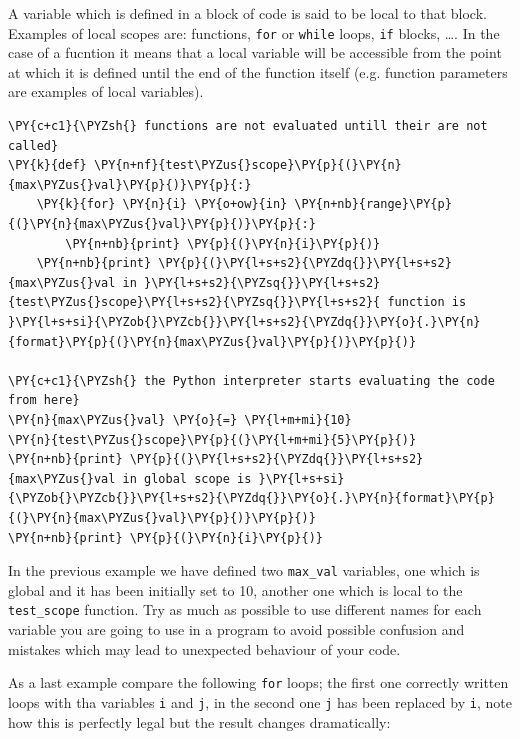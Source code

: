 A variable which is defined in a block of code is said to be local to that block. Examples of local scopes are: functions, \texttt{for} or \texttt{while} loops, \texttt{if} blocks, \ldots. In the case of a fucntion it means that a local variable will be accessible from the point at which it is defined until the end of the function itself (e.g. function parameters are examples of local variables).

\begin{Verbatim}[commandchars=\\\{\}]
\PY{c+c1}{\PYZsh{} functions are not evaluated untill their are not called}
\PY{k}{def} \PY{n+nf}{test\PYZus{}scope}\PY{p}{(}\PY{n}{max\PYZus{}val}\PY{p}{)}\PY{p}{:}
    \PY{k}{for} \PY{n}{i} \PY{o+ow}{in} \PY{n+nb}{range}\PY{p}{(}\PY{n}{max\PYZus{}val}\PY{p}{)}\PY{p}{:}
        \PY{n+nb}{print} \PY{p}{(}\PY{n}{i}\PY{p}{)}
    \PY{n+nb}{print} \PY{p}{(}\PY{l+s+s2}{\PYZdq{}}\PY{l+s+s2}{max\PYZus{}val in }\PY{l+s+s2}{\PYZsq{}}\PY{l+s+s2}{test\PYZus{}scope}\PY{l+s+s2}{\PYZsq{}}\PY{l+s+s2}{ function is }\PY{l+s+si}{\PYZob{}\PYZcb{}}\PY{l+s+s2}{\PYZdq{}}\PY{o}{.}\PY{n}{format}\PY{p}{(}\PY{n}{max\PYZus{}val}\PY{p}{)}\PY{p}{)}
    
\PY{c+c1}{\PYZsh{} the Python interpreter starts evaluating the code from here}
\PY{n}{max\PYZus{}val} \PY{o}{=} \PY{l+m+mi}{10}
\PY{n}{test\PYZus{}scope}\PY{p}{(}\PY{l+m+mi}{5}\PY{p}{)}
\PY{n+nb}{print} \PY{p}{(}\PY{l+s+s2}{\PYZdq{}}\PY{l+s+s2}{max\PYZus{}val in global scope is }\PY{l+s+si}{\PYZob{}\PYZcb{}}\PY{l+s+s2}{\PYZdq{}}\PY{o}{.}\PY{n}{format}\PY{p}{(}\PY{n}{max\PYZus{}val}\PY{p}{)}\PY{p}{)}
\PY{n+nb}{print} \PY{p}{(}\PY{n}{i}\PY{p}{)}
\end{Verbatim}

In the previous example we have defined two \texttt{max\_val} variables, one which is global and it has been initially set to 10, another one which is local to the \texttt{test\_scope} function.
Try as much as possible to use different names for each variable you are going to use in a program to avoid possible confusion and mistakes which may lead to unexpected behaviour of your code.

As a last example compare the following \texttt{for} loops; the first one correctly written loops with tha variables \texttt{i} and \texttt{j}, in the second one \texttt{j} has been replaced by \texttt{i}, note how this is perfectly legal but the result changes dramatically:


